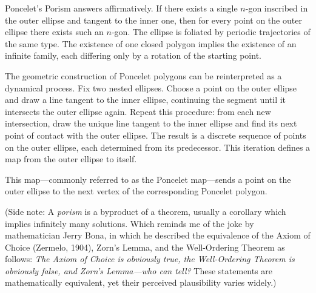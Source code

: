 Poncelet’s Porism answers affirmatively. If there exists a single $n$-gon inscribed in the outer ellipse and tangent to the inner one, then for every point on the outer ellipse there exists such an $n$-gon. The ellipse is foliated by periodic trajectories of the same type. The existence of one closed polygon implies the existence of an infinite family, each differing only by a rotation of the starting point.

\begin{center}
\end{center}

The geometric construction of Poncelet polygons can be reinterpreted as a dynamical process. Fix two nested ellipses. Choose a point on the outer ellipse and draw a line tangent to the inner ellipse, continuing the segment until it intersects the outer ellipse again. Repeat this procedure: from each new intersection, draw the unique line tangent to the inner ellipse and find its next point of contact with the outer ellipse. The result is a discrete sequence of points on the outer ellipse, each determined from its predecessor. This iteration defines a map from the outer ellipse to itself.

This map—commonly referred to as the Poncelet map—sends a point on the outer ellipse to the next vertex of the corresponding Poncelet polygon.

(Side note: A \emph{porism} is a byproduct of a theorem, usually a corollary which implies infinitely many solutions. Which reminds me of the joke by mathematician Jerry Bona, in which he described the equivalence of the Axiom of Choice (Zermelo, 1904), Zorn's Lemma, and the Well-Ordering Theorem as follows: \textit{\QENOpen{}The Axiom of Choice is obviously true, the Well-Ordering Theorem is obviously false, and Zorn's Lemma—who can tell?\QENClose{}} These statements are mathematically equivalent, yet their perceived plausibility varies widely.)

